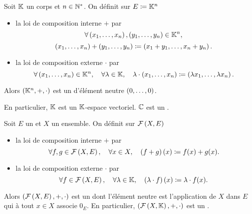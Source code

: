 \documentclass{magnolia}
\begin{document}
\begin{definition}[utile=-3]
Soit $\mathbb{K}$ un corps et $n\in{\mathbb{N}^*}$. On définit sur $E\coloneqq\mathbb{K}^n$
\begin{itemize}
\item la loi de composition interne $+$ par
  \[\forall \left(x_1,\ldots,x_n\right),\left(y_1,\ldots,y_n\right)\in\mathbb{K}^n,\]
  \[\left(x_1,\ldots,x_n\right)+\left(y_1,\ldots,y_n\right)\coloneqq\left(x_1+y_1,\ldots,x_n+y_n\right).\]
\item la loi de composition externe $\cdot$ par
  \[\forall \left(x_1,\ldots,x_n\right)\in\mathbb{K}^n ,\quad \forall \lambda\in\mathbb{K} ,\quad
    \lambda\cdot\left(x_1,\ldots,x_n\right)\coloneqq\left(\lambda x_1,\ldots,\lambda x_n\right).\]
\end{itemize}
Alors $\left(\mathbb{K}^n,+,\cdot\right)$ est un \Kev d'élément neutre $\left(0,\ldots,0\right)$.
\end{definition}

\begin{remarques}
\remarque[utile=-1] En particulier, $\mathbb{K}$ est un $\mathbb{K}$-espace vectoriel.
\remarque $\mathbb{C}$ est un \Rev.
\end{remarques}


\begin{definition}[utile=-3]
Soit $E$ un \Kev et $X$ un ensemble. On définit sur
$\mathcal{F}\left(X,E\right)$
\begin{itemize}
\item la loi de composition interne $+$ par
  \[\forall f,g\in\mathcal{F}\left(X,E\right) ,\quad \forall x\in X ,\quad
    \left(f+g\right)(x)\coloneqq f(x)+g(x).\]
\item la loi de composition externe $\cdot$ par
  \[\forall f\in\mathcal{F}\left(X,E\right) ,\quad \forall \lambda\in\mathbb{K} ,\quad
    \left(\lambda\cdot f\right)(x)\coloneqq\lambda \cdot f(x).\]
\end{itemize}
Alors $\left(\mathcal{F}\left(X,E\right),+,\cdot\right)$ est un \Kev dont l'élément neutre est
l'application de $X$ dans $E$ qui à tout $x\in X$ associe $0_E$. En particulier,
$\left(\mathcal{F}\left(X,\mathbb{K}\right),+,\cdot\right)$ est un \Kev.
\end{definition}
\end{document}
